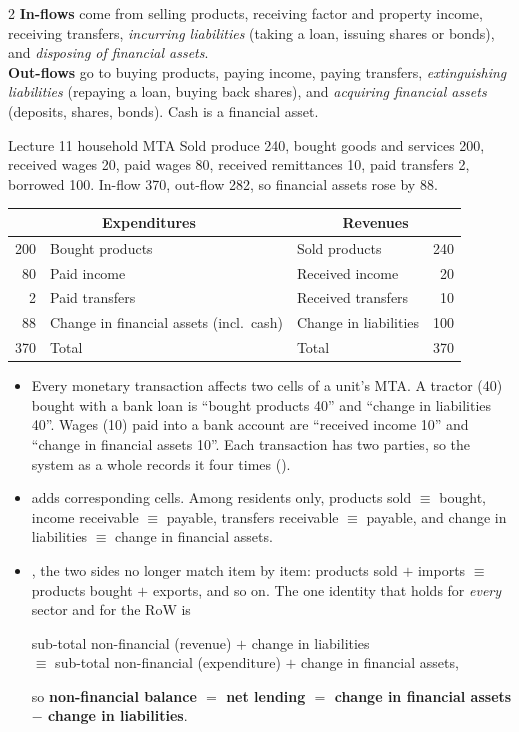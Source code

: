 \begin{multicols}{2}\small
\textbf{In-flows} come from selling products, receiving factor and property income, receiving
transfers, \emph{incurring liabilities} (taking a loan, issuing shares or bonds), and
\emph{disposing of financial assets}.\\
\columnbreak
\textbf{Out-flows} go to buying products, paying income, paying transfers, \emph{extinguishing
liabilities} (repaying a loan, buying back shares), and \emph{acquiring financial assets}
(deposits, shares, bonds). Cash is a financial asset.
\end{multicols}

\begin{tmpl}{Lecture 11 household MTA}
\small Sold produce 240, bought goods and services 200, received wages 20, paid wages 80, received
remittances 10, paid transfers 2, borrowed 100. In-flow 370, out-flow 282, so financial assets
rose by 88.\\[2pt]
\centering
\begin{tabular}{@{}rl|lr@{}}
\toprule
\multicolumn{2}{c|}{\textbf{Expenditures}} & \multicolumn{2}{c}{\textbf{Revenues}} \\
\midrule
200 & Bought products & Sold products & 240 \\
80 & Paid income & Received income & 20 \\
2 & Paid transfers & Received transfers & 10 \\
88 & Change in financial assets (incl.\ cash) & Change in liabilities & 100 \\
\midrule
370 & Total & Total & 370 \\
\bottomrule
\end{tabular}
\end{tmpl}

\begin{itemize}
\item {} Every monetary transaction affects two cells of a unit's MTA. A tractor
  (40) bought with a bank loan is ``bought products 40'' and ``change in liabilities 40''. Wages
  (10) paid into a bank account are ``received income 10'' and ``change in financial assets 10''.
  Each transaction has two parties, so the system as a whole records it four times
  ().
\item {} adds corresponding cells. Among residents only, products sold $\equiv$
  bought, income receivable $\equiv$ payable, transfers receivable $\equiv$ payable, and change
  in liabilities $\equiv$ change in financial assets.
\item {}, the two sides no longer match item by item:
  products sold $+$ imports $\equiv$ products bought $+$ exports, and so on. The one identity
  that holds for \emph{every} sector and for the RoW is
  \begin{center}
  sub-total non-financial (revenue) $+$ change in liabilities\\
  $\equiv$ sub-total non-financial (expenditure) $+$ change in financial assets,
  \end{center}
  so \textbf{non-financial balance $=$ net lending $=$ change in financial assets $-$ change in
  liabilities}.
\end{itemize}

